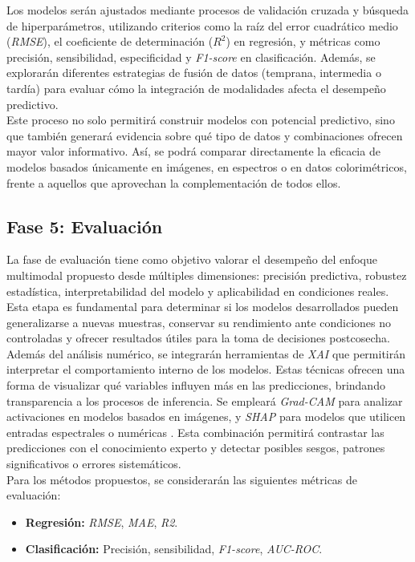 Los modelos serán ajustados mediante procesos de validación cruzada y búsqueda de hiperparámetros, utilizando criterios como la raíz del error cuadrático medio (\textit{RMSE}), el coeficiente de determinación (\textit{$R^2$}) en regresión, y métricas como precisión, sensibilidad, especificidad y \textit{F1-score} en clasificación. Además, se explorarán diferentes estrategias de fusión de datos (temprana, intermedia o tardía) para evaluar cómo la integración de modalidades afecta el desempeño predictivo.\\

Este proceso no solo permitirá construir modelos con potencial predictivo, sino que también generará evidencia sobre qué tipo de datos y combinaciones ofrecen mayor valor informativo. Así, se podrá comparar directamente la eficacia de modelos basados únicamente en imágenes, en espectros o en datos colorimétricos, frente a aquellos que aprovechan la complementación de todos ellos.

\subsection{Fase 5: Evaluación}

La fase de evaluación tiene como objetivo valorar el desempeño del enfoque multimodal propuesto desde múltiples dimensiones: precisión predictiva, robustez estadística, interpretabilidad del modelo y aplicabilidad en condiciones reales. Esta etapa es fundamental para determinar si los modelos desarrollados pueden generalizarse a nuevas muestras, conservar su rendimiento ante condiciones no controladas y ofrecer resultados útiles para la toma de decisiones postcosecha.\\

Además del análisis numérico, se integrarán herramientas de \textit{XAI} que permitirán interpretar el comportamiento interno de los modelos. Estas técnicas ofrecen una forma de visualizar qué variables influyen más en las predicciones, brindando transparencia a los procesos de inferencia. Se empleará \textit{Grad-CAM} para analizar activaciones en modelos basados en imágenes, y \textit{SHAP} para modelos que utilicen entradas espectrales o numéricas \parencite{lundberg_unified_2017}. Esta combinación permitirá contrastar las predicciones con el conocimiento experto y detectar posibles sesgos, patrones significativos o errores sistemáticos.\\

Para los métodos propuestos, se considerarán las siguientes métricas de evaluación:
\begin{itemize}
    \item \textbf{Regresión:} \textit{RMSE}, \textit{MAE}, \textit{R2}.
    \item \textbf{Clasificación:} Precisión, sensibilidad, \textit{F1-score}, \textit{AUC-ROC}.
\end{itemize}

